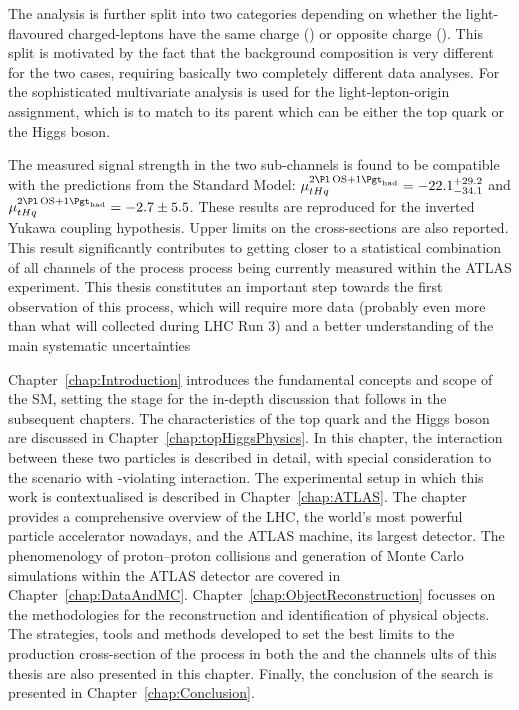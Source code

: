 The analysis is further split into two categories depending on whether the light-flavoured charged-leptons have the same charge (\dilepSStau) or opposite charge (\dilepOStau). This split is motivated by the fact that the background composition is very different for the two cases, requiring basically two completely different data analyses. For the \dilepSStau sophisticated multivariate analysis is used for the light-lepton-origin assignment, which is to match to its parent which can be either the top quark or the Higgs boson.

The measured signal strength in the two sub-channels is found
to be compatible with the predictions from the Standard Model:
$\mu_{\tHq}^{\dilepOStau} = -22.1^{+29.2}_{-34.1}$ and $\mu_{\tHq}^{\dilepOStau} = -2.7\pm 5.5$.
These results are reproduced for the inverted Yukawa coupling hypothesis. 
Upper limits on the cross-sections are also reported. 
This result significantly contributes to getting closer to a statistical combination of all channels of the process \tHq process being
currently measured within the ATLAS experiment.
This thesis constitutes an important step towards the first observation of this process, which will require more data (probably even more than what will collected during LHC Run 3) and a better understanding of the main systematic uncertainties


Chapter~\ref{chap:Introduction} introduces the fundamental concepts 
and scope of the SM, setting the stage for the in-depth discussion
that follows in the subsequent chapters.
The characteristics of the top quark and the Higgs boson are discussed in
Chapter~\ref{chap:topHiggsPhysics}. In this chapter, the interaction
between these two particles is described in detail, with 
special consideration to the scenario with \CP-violating interaction.
The experimental setup in which this work is contextualised is described in Chapter~\ref{chap:ATLAS}. 
 The chapter provides a comprehensive overview of the LHC, the world's most powerful 
 particle accelerator nowadays, and the ATLAS machine, its largest detector.
The phenomenology of proton--proton collisions and generation of Monte Carlo simulations within the ATLAS 
detector are covered in Chapter~\ref{chap:DataAndMC}. 
Chapter~\ref{chap:ObjectReconstruction} focusses on the methodologies for the reconstruction and identification of physical objects.
The strategies, tools and methods developed to set the best limits to the production cross-section of the \tHq process in 
both the \dilepOStau and the \dilepSStau channels ults of this thesis are also presented in this chapter.
Finally, the conclusion of the \tHq search is presented in Chapter~\ref{chap:Conclusion}.



